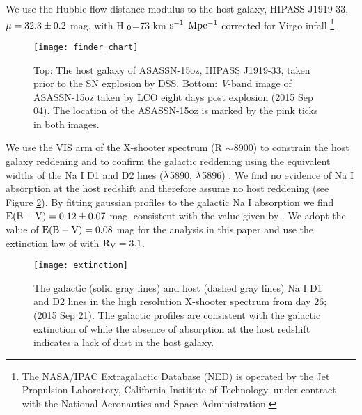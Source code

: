 \documentclass[a4paper,fleqn,usenatbib]{mnras}
\begin{document}
We use the Hubble flow distance modulus to the host galaxy, HIPASS J1919-33,  $\rm{\mu=32.3\pm 0.2}$ mag, with H $\rm{_{0}}$=73 km $\rm{s^{-1}}$ $\rm{Mpc^{-1} }$ corrected for Virgo infall
\footnote{The NASA/IPAC Extragalactic Database (NED) is operated by the Jet Propulsion Laboratory, California Institute of Technology, under contract with the National Aeronautics and Space Administration.}.
\begin{figure}
\begin{center}
\texttt{[image: finder\_chart]} %
\caption{Top: The host galaxy of ASASSN-15oz, HIPASS J1919-33, taken prior to the SN explosion by DSS. 
Bottom: {\it V}-band image of ASASSN-15oz taken by LCO eight days post explosion (2015 Sep 04).
The location of the ASASSN-15oz is marked by the pink ticks in both images.}
\label{fig:finder}
\end{center}
\end{figure}
We use the VIS arm of the X-shooter spectrum (R $\rm{\sim}$8900) to constrain the host galaxy reddening and to confirm the galactic reddening using the equivalent widths of the Na I D1 and D2 lines ($\rm{\lambda}$5890, $\rm{\lambda}$5896) \citep{2012poznanski}. 
We find no evidence of Na I absorption at the host redshift and therefore assume no host reddening (see Figure \ref{fig:extinction}). 
By fitting gaussian profiles to the galactic Na I absorption we find $\rm{E(B-V) = 0.12\pm0.07}$ mag, consistent with the value given by \citet{2011schlafly}. 
We adopt the \citet{2011schlafly}  value of $\rm{E(B-V) = 0.08}$ mag for the analysis in this paper and use the extinction law of \citet{1989cardelli} with $\rm{R_{V} = 3.1}$. 
\begin{figure}
\begin{center}
\texttt{[image: extinction]} %
\caption{The galactic (solid gray lines) and host (dashed gray lines) Na I D1 and D2 lines in the high resolution X-shooter spectrum from day 26; (2015 Sep 21).
The galactic profiles are consistent with the galactic extinction of \citet{2011schlafly} while the absence of absorption at the host redshift indicates a lack of dust in the host galaxy. }
\label{fig:extinction}
\end{center}
\end{figure}
\end{document}
